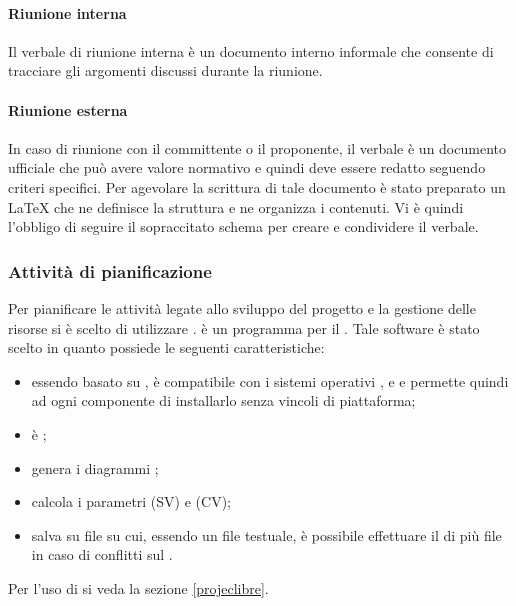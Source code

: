 \documentclass[12pt,a4paper]{article}
\begin{document}
\paragraph{Riunione interna}
Il verbale di riunione interna è un documento interno informale che consente di tracciare gli argomenti discussi durante la riunione.

\paragraph{Riunione esterna}
In caso di riunione con il committente o il proponente, il verbale è un documento ufficiale che può avere valore normativo e quindi deve essere redatto seguendo criteri specifici.
Per agevolare la scrittura di tale documento è stato preparato un  \LaTeX{} che ne definisce la struttura e ne organizza i contenuti. Vi è quindi l'obbligo di seguire il sopraccitato schema per creare e condividere il verbale.

\subsubsection{Attività di pianificazione}
Per pianificare le attività legate allo sviluppo del progetto e la gestione delle risorse si è scelto di utilizzare .
 è un programma  per il . Tale software è stato scelto in quanto possiede le seguenti caratteristiche:
\begin{itemize}
	\item essendo basato su , è compatibile con i sistemi operativi ,  e  e permette quindi ad ogni componente di installarlo senza vincoli di piattaforma; 
	\item è ;
	\item genera i diagrammi ;
	\item calcola i parametri  (SV) e  (CV);
    \item salva su file  su cui, essendo un file testuale, è possibile effettuare il  di più file in caso di conflitti sul .
\end{itemize}
Per l'uso di  si veda la sezione \ref{projeclibre}.
\end{document}
